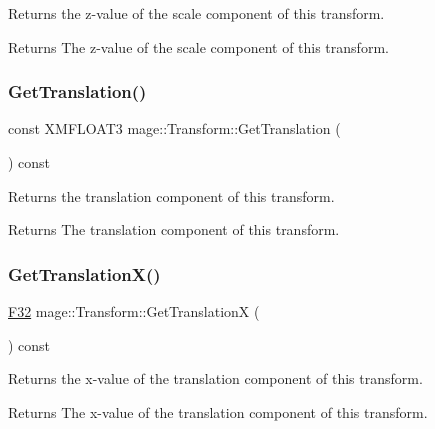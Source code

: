 Returns the z-\/value of the scale component of this transform.

\begin{DoxyReturn}{Returns}
The z-\/value of the scale component of this transform. 
\end{DoxyReturn}
\hypertarget{classmage_1_1_transform_af034983b5df429b31a3229270cc0b00b}{}\label{classmage_1_1_transform_af034983b5df429b31a3229270cc0b00b} 
\subsubsection{\texorpdfstring{Get\+Translation()}{GetTranslation()}}
{\footnotesize\ttfamily const X\+M\+F\+L\+O\+A\+T3 mage\+::\+Transform\+::\+Get\+Translation (\begin{DoxyParamCaption}{ }\end{DoxyParamCaption}) const\hspace{0.3cm}{\ttfamily [noexcept]}}

Returns the translation component of this transform.

\begin{DoxyReturn}{Returns}
The translation component of this transform. 
\end{DoxyReturn}
\hypertarget{classmage_1_1_transform_a90b2c059a45964bf4de816a4b7e6c55c}{}\label{classmage_1_1_transform_a90b2c059a45964bf4de816a4b7e6c55c} 
\subsubsection{\texorpdfstring{Get\+Translation\+X()}{GetTranslationX()}}
{\footnotesize\ttfamily \hyperlink{namespacemage_aa97e833b45f06d60a0a9c4fc22ae02c0}{F32} mage\+::\+Transform\+::\+Get\+TranslationX (\begin{DoxyParamCaption}{ }\end{DoxyParamCaption}) const\hspace{0.3cm}{\ttfamily [noexcept]}}

Returns the x-\/value of the translation component of this transform.

\begin{DoxyReturn}{Returns}
The x-\/value of the translation component of this transform. 
\end{DoxyReturn}
\hypertarget{classmage_1_1_transform_a3a806edeeca4db92bdfa4d401ba17cb4}{}\label{classmage_1_1_transform_a3a806edeeca4db92bdfa4d401ba17cb4} 
